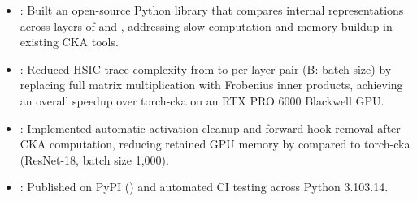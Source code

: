 \begin{itemize}
  \item {}: Built an open-source Python library that compares internal representations across layers of  and , addressing slow computation and memory buildup in existing CKA tools.
  \item {}: Reduced HSIC trace complexity from to per layer pair (B: batch size) by replacing full matrix multiplication with Frobenius inner products, achieving an overall \resumeEmphasis{7.0\ensuremath{\times}} speedup over torch-cka on an RTX PRO 6000 Blackwell GPU.
  \item {}: Implemented automatic activation cleanup and forward-hook removal after CKA computation, reducing retained GPU memory by  compared to torch-cka (ResNet-18, batch size 1,000).
  \item {}: Published on PyPI () and automated CI testing across Python 3.10\textendash{}3.14.
\end{itemize}
